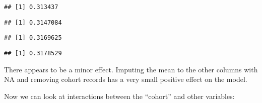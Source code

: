 \documentclass[
]{article}
\newenvironment{Shaded}{\begin{snugshade}}{\end{snugshade}}
\newcommand{\FunctionTok}[1]{\textcolor[rgb]{0.00,0.00,0.00}{#1}}
\newcommand{\NormalTok}[1]{#1}
\newcommand{\SpecialCharTok}[1]{\textcolor[rgb]{0.00,0.00,0.00}{#1}}
\begin{document}
\begin{verbatim}
## [1] 0.313437
\end{verbatim}

\begin{Shaded}
\end{Shaded}

\begin{verbatim}
## [1] 0.3147084
\end{verbatim}

\begin{Shaded}
\end{Shaded}

\begin{verbatim}
## [1] 0.3169625
\end{verbatim}

\begin{Shaded}
\end{Shaded}

\begin{verbatim}
## [1] 0.3178529
\end{verbatim}

There appears to be a minor effect. Imputing the mean to the other
columns with NA and removing cohort records has a very small positive
effect on the model.

Now we can look at interactions between the ``cohort'' and other
variables:
\end{document}
